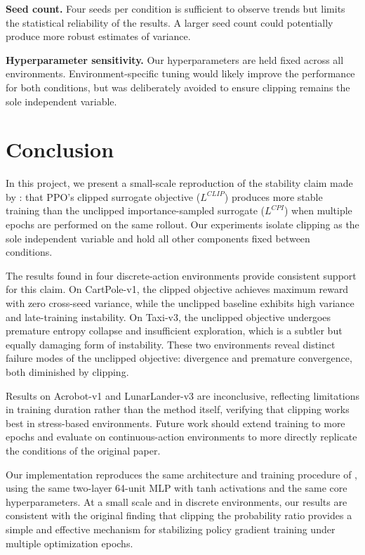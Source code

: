 \documentclass{article}
\begin{document}
\textbf{Seed count.} Four seeds per condition is sufficient to observe trends but limits the statistical reliability of the results. A larger seed count could potentially produce more robust estimates of variance.

\textbf{Hyperparameter sensitivity.} Our hyperparameters are held fixed across all environments. Environment-specific tuning would likely improve the performance for both conditions, but was deliberately avoided to ensure clipping remains the sole independent variable.


\section{Conclusion}

In this project, we present a small-scale reproduction of the stability claim made by \citep{schulman2017ppo}: that PPO's clipped surrogate objective ($L^{CLIP}$) produces more stable training than the unclipped importance-sampled surrogate ($L^{CPI}$) when multiple epochs are performed on the same rollout. Our experiments isolate clipping as the sole independent variable and hold all other components fixed between conditions.

The results found in four discrete-action environments provide consistent support for this claim. On CartPole-v1, the clipped objective achieves maximum reward with zero cross-seed variance, while the unclipped baseline exhibits high variance and late-training instability. On Taxi-v3, the unclipped objective undergoes premature entropy collapse and insufficient exploration, which is a subtler but equally damaging form of instability. These two environments reveal distinct failure modes of the unclipped objective: divergence and premature convergence, both diminished by clipping.

Results on Acrobot-v1 and LunarLander-v3 are inconclusive, reflecting limitations in training duration rather than the method itself, verifying that clipping works best in stress-based environments. Future work should extend training to more epochs and evaluate on continuous-action environments to more directly replicate the conditions of the original paper.

Our implementation reproduces the same architecture and training procedure of \citep{schulman2017ppo}, using the same two-layer 64-unit MLP with tanh activations and the same core hyperparameters. At a small scale and in discrete environments, our results are consistent with the original finding that clipping the probability ratio provides a simple and effective mechanism for stabilizing policy gradient training under multiple optimization epochs.
\end{document}
